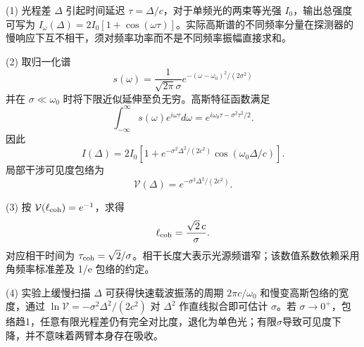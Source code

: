 (1) 光程差 \(\Delta \) 引起时间延迟 \(\tau=\Delta/c\)，对于单频光的两束等光强 \(I_{0}\)，输出总强度可写为 \(I_\omega(\Delta)=2I_0[1+\cos(\omega\tau)]\)。实际高斯谱的不同频率分量在探测器的慢响应下互不相干，须对频率功率而不是不同频率振幅直接求和。

(2) 取归一化谱
\[
s(\omega)=\frac1{\sqrt{2\pi}\sigma}
e^{-(\omega-\omega_0)^2/(2\sigma^2)}
\]
并在 \(\sigma\ll\omega_0\) 时将下限近似延伸至负无穷。高斯特征函数满足
\[
\int_{-\infty}^\infty s(\omega)e^{i\omega\tau}d\omega
=e^{i\omega_0\tau-\sigma^2\tau^2/2}.
\]
因此
\[
I(\Delta)=2I_0\left[1+
e^{-\sigma^2\Delta^2/(2c^2)}
\cos(\omega_0\Delta/c)\right].
\]
局部干涉可见度包络为
\[
\mathcal V(\Delta)=e^{-\sigma^2\Delta^2/(2c^2)}.
\]

(3) 按 \(\mathcal V(\ell_{\rm coh})=e^{-1}\)，求得
\[
\ell_{\rm coh}=\frac{\sqrt2\,c}{\sigma}.
\]
对应相干时间为 \(\tau_{\rm coh}=\sqrt2/\sigma\)。相干长度大表示光源频谱窄；该数值系数依赖采用角频率标准差及 1/e 包络的约定。

(4) 实验上缓慢扫描 \(\Delta \) 可获得快速载波振荡的周期 \(2\pi c/\omega_0\) 和慢变高斯包络的宽度，通过 \(\ln\mathcal V=-\sigma^2\Delta^2/(2c^2)\) 对 \(\Delta ^{2}\) 作直线拟合即可估计 \(\sigma \)。若 \(\sigma \to 0^{+}\)，包络趋1，任意有限光程差仍有完全对比度，退化为单色光；有限\(\sigma \)导致可见度下降，并不意味着两臂本身存在吸收。
